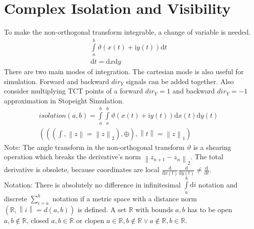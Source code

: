 \documentclass{report}
\newcommand\norm[1]{\left\lVert#1\right\rVert}
\begin{document}
\section{Complex Isolation and Visibility}
To make the non-orthogonal transform integrable, a change of variable is needed.
\begin{align}
\int \limits _{a}^{b} \vartheta (x(t)+\mathrm{i}y(t)) \mathrm{d} t\\
\mathrm{d} t = \mathrm{d}x \mathrm{d}y
\end{align}
There are two main modes of integration. The cartesian mode is also useful for simulation. Forward and backward $dir_{Y}$ signals can be added together. Also consider multiplying TCT points of a forward $dir_{Y}=1$ and backward $dir_{Y}=-1$ approximation in Stopeight Simulation.
\begin{align}
isolation(a,b)=\int \limits _{a}^{b} \int \limits _{a}^{b} \vartheta (x(t)+\mathrm{i}y(t)) \mathrm{d}x(t) \mathrm{d}y(t)\\
(((\int,\norm{z}=\norm{z}_2),\oplus),\norm{t}=\norm{z}_1)
\end{align}
Note: The angle transform in the non-orthogonal transform $\vartheta$ is a shearing operation which breaks the derivative's norm $\norm{z_{n+1}-z_{n}}_2$. The total derivative is obsolete, because coordinates are local $\frac{\mathrm{d}}{\mathrm{d} x(t)}\frac{\mathrm{d}}{\mathrm{d} y(t)}\not = \frac{\mathrm{d}}{\mathrm{d}t}$.\\
Notation: There is absolutely no difference in infinitesimal $\int \limits _{a}^{b} \mathrm{d}i$ notation and discrete $\sum  \limits _{i=a}^{b}$ notation if a metric space with a distance norm $(\mathbb{R},\norm{i}=d(a,b))$ is defined. A set $\mathbb{R}$ with bounds $a,b$ has to be open $a,b \not \in \mathbb{R}$, closed $a,b \in \mathbb{R}$ or clopen $a \in \mathbb{R}, b \not \in \mathbb{R} \lor a \not \in \mathbb{R},b \in \mathbb{R}$.\\
\end{document}
